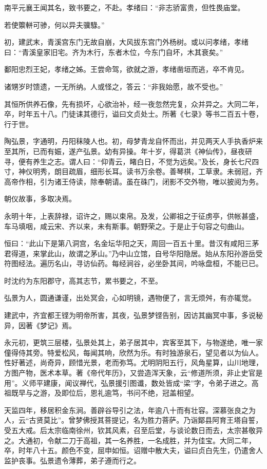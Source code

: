 \documentclass[12pt,UTF8]{ctexbook}
\begin{document}
南平元襄王闻其名，致书要之，不赴。孝绪曰：“非志骄富贵，但性畏庙堂。

若使籞軿可骖，何以异夫骥騄。”

初，建武末，青溪宫东门无故自崩，大风拔东宫门外杨树。或以问孝绪，孝绪曰：“青溪皇家旧宅。齐为木行，东者木位，今东门自坏，木其衰矣。”

鄱阳忠烈王妃，孝绪之姊。王尝命驾，欲就之游，孝绪凿垣而逃，卒不肯见。

诸甥岁时馈遗，一无所纳。人或怪之，答云：“非我始愿，故不受也。”

其恒所供养石像，先有损坏，心欲治补，经一夜忽然完复，众并异之。大同二年，卒，时年五十八。门徒诔其德行，谥曰文贞处士。所著《七录》等书二百五十卷，行于世。

陶弘景，字通明，丹阳秣陵人也。初，母梦青龙自怀而出，并见两天人手执香炉来至其所，已而有娠，遂产弘景。幼有异操。年十岁，得葛洪《神仙传》，昼夜研寻，便有养生之志。谓人曰：“仰青云，睹白日，不觉为远矣。”及长，身长七尺四寸，神仪明秀，朗目疏眉，细形长耳。读书万余卷。善琴棋，工草隶。未弱冠，齐高帝作相，引为诸王侍读，除奉朝请。虽在硃门，闭影不交外物，唯以披阅为务。

朝仪故事，多取决焉。

永明十年，上表辞禄，诏许之，赐以束帛。及发，公卿祖之于征虏亭，供帐甚盛，车马填咽，咸云宋、齐以来，未有斯事。朝野荣之。于是止于句容之句曲山。

恒曰：“此山下是第八洞宫，名金坛华阳之天，周回一百五十里。昔汉有咸阳三茅君得道，来掌此山，故谓之茅山。”乃中山立馆，自号华阳隐居。始从东阳孙游岳受符图经法。遍历名山，寻访仙药。每经涧谷，必坐卧其间，吟咏盘桓，不能已已。

时沈约为东阳郡守，高其志节，累书要之，不至。

弘景为人，圆通谦谨，出处冥会，心如明镜，遇物便了，言无烦舛，有亦辄觉。

建武中，齐宜都王铿为明帝所害，其夜，弘景梦铿告别，因访其幽冥中事，多说秘异，因著《梦记》焉。

永元初，更筑三层楼，弘景处其上，弟子居其中，宾客至其下，与物遂绝，唯一家僮得侍其旁。特爱松风，每闻其响，欣然为乐。有时独游泉石，望见者以为仙人。性好著述，尚奇异，顾惜光景，老而弥笃。尤明阴阳五行，风角星算，山川地理，方图产物，医术本草。著《帝代年历》，又尝造浑天象，云“修道所须，非止史官是用”。义师平建康，闻议禅代，弘景援引图谶，数处皆成“梁”字，令弟子进之。高祖既早与之游，及即位后，恩礼逾笃，书问不绝，冠盖相望。

天监四年，移居积金东涧。善辟谷导引之法，年逾八十而有壮容。深慕张良之为人，云“古贤莫比”。曾梦佛授其菩提记，名为胜力菩萨。乃诣鄮县阿育王塔自誓，受五大戒。后太宗临南徐州，钦其风素，召至后堂，与谈论数日而去，太宗甚敬异之。大通初，令献二刀于高祖，其一名养胜，一名成胜，并为佳宝。大同二年，卒，时年八十五。颜色不变，屈申如恒。诏赠中散大夫，谥曰贞白先生，仍遣舍人监护丧事。弘景遗令薄葬，弟子遵而行之。
\end{document}
